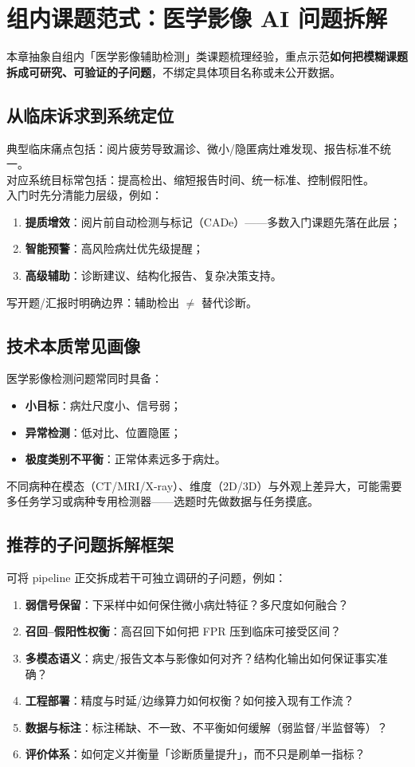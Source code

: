 \section{组内课题范式：医学影像 AI 问题拆解}

本章抽象自组内「医学影像辅助检测」类课题梳理经验，重点示范\textbf{如何把模糊课题拆成可研究、可验证的子问题}，不绑定具体项目名称或未公开数据。

\subsection{从临床诉求到系统定位}
典型临床痛点包括：阅片疲劳导致漏诊、微小/隐匿病灶难发现、报告标准不统一。\\
对应系统目标常包括：提高检出、缩短报告时间、统一标准、控制假阳性。\\
入门时先分清能力层级，例如：
\begin{enumerate}
  \item \textbf{提质增效}：阅片前自动检测与标记（CADe）——多数入门课题先落在此层；
  \item \textbf{智能预警}：高风险病灶优先级提醒；
  \item \textbf{高级辅助}：诊断建议、结构化报告、复杂决策支持。
\end{enumerate}
写开题/汇报时明确边界：辅助检出 $\neq$ 替代诊断。

\subsection{技术本质常见画像}
医学影像检测问题常同时具备：
\begin{itemize}
  \item \textbf{小目标}：病灶尺度小、信号弱；
  \item \textbf{异常检测}：低对比、位置隐匿；
  \item \textbf{极度类别不平衡}：正常体素远多于病灶。
\end{itemize}
不同病种在模态（CT/MRI/X-ray）、维度（2D/3D）与外观上差异大，可能需要多任务学习或病种专用检测器——选题时先做数据与任务摸底。

\subsection{推荐的子问题拆解框架}
可将 pipeline 正交拆成若干可独立调研的子问题，例如：
\begin{enumerate}
  \item \textbf{弱信号保留}：下采样中如何保住微小病灶特征？多尺度如何融合？
  \item \textbf{召回--假阳性权衡}：高召回下如何把 FPR 压到临床可接受区间？
  \item \textbf{多模态语义}：病史/报告文本与影像如何对齐？结构化输出如何保证事实准确？
  \item \textbf{工程部署}：精度与时延/边缘算力如何权衡？如何接入现有工作流？
  \item \textbf{数据与标注}：标注稀缺、不一致、不平衡如何缓解（弱监督/半监督等）？
  \item \textbf{评价体系}：如何定义并衡量「诊断质量提升」，而不只是刷单一指标？
\end{enumerate}

